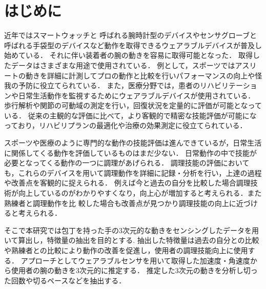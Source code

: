\section{はじめに}
近年ではスマートウォッチと
呼ばれる腕時計型のデバイスやセンサグローブと呼ばれる手袋型のデバイスなど動作を取得できるウェアラブルデバイスが普及し始めている．
それに伴い装着者の腕の動きを容易に取得可能となった．
取得したデータはさまざまな用途で使用されている．
例として，スポーツではアスリートの動きを詳細に計測してプロの動作と比較を行いパフォーマンスの向上や怪我の予防に役立てられている．
また，医療分野では，患者のリハビリテーションや日常生活動作を監視するためにウェアラブルデバイスが使用されている．
歩行解析や関節の可動域の測定を行い，回復状況を定量的に評価が可能となっている．
従来の主観的な評価に比べて，より客観的で精密な技能評価が可能になっており，リハビリプランの最適化や治療の効果測定に役立てられている．

スポーツや医療のように専門的な動作の技能評価は進んできているが，日常生活に関係してくる動作を評価しているものはまだ少ない．
日常動作の中で技能が必要となってくる動作の一つに調理があげられる．
調理技能の評価においても，これらのデバイスを用いて調理動作を詳細に記録・分析を行い，上達の過程や改善点を客観的に捉えられる．
例えば今と過去の自分を比較した場合調理技術が向上しているのがわかりやすくなり，向上心が増加すると考えられる．また熟練者と調理動作を比
較した場合も改善点が見つかり調理技能の向上に近づけると考えられる．

そこで本研究では包丁を持った手の3次元的な動きをセンシングしたデータを用いて算出し，特徴量の抽出を目的とする.
抽出した特徴量は過去の自分との比較や熟練者との比較により動作の改善を促進し，使用者の調理技能向上に使用する．
アプローチとしてウェアラブルセンサを用いて取得した加速度・角速度から使用者の腕の動きを3次元的に推定する．
推定した3次元の動きを分析し切った回数や切るペースなどを抽出する．